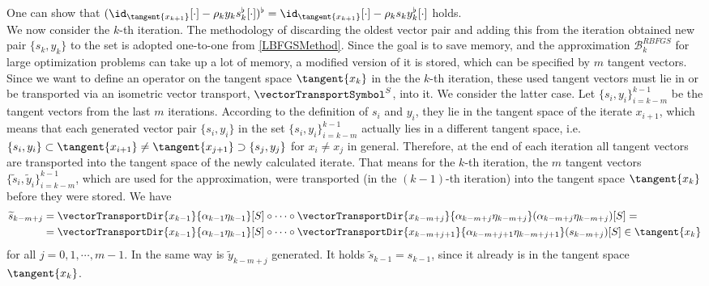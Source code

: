 One can show that $(\id_{\tangent{x_{k+1}}}[\cdot] - \rho_k y_k s^{\flat}_k [\cdot])^{\flat} = \id_{\tangent{x_{k+1}}}[\cdot] - \rho_k s_k y^{\flat}_k [\cdot]$ holds. \\
We now consider the $k$-th iteration. The methodology of discarding the oldest vector pair and adding this from the iteration obtained new pair $\{ s_k, y_k\}$ to the set is adopted one-to-one from \cref{LBFGSMethod}. Since the goal is to save memory, and the approximation $\mathcal{B}^{RBFGS}_k$ for large optimization problems can take up a lot of memory, a modified version of it is stored, which can be specified by $m$ tangent vectors. Since we want to define an operator on the tangent space $\tangent{x_k}$ in the the $k$-th iteration, these used tangent vectors must lie in or be transported via an isometric vector transport, $\vectorTransportSymbol^S$, into it. We consider the latter case. Let $\{ s_i, y_i\}_{i=k-m}^{k-1}$ be the tangent vectors from the last $m$ iterations. According to the definition of $s_i$ and $y_i$, they lie in the tangent space of the iterate $x_{i+1}$, which means that each generated vector pair $\{ s_i, y_i\}$ in the set $\{ s_i, y_i\}_{i=k-m}^{k-1}$ actually lies in a different tangent space, i.e. $\{ s_i, y_i\} \subset \tangent{x_{i+1}} \neq \tangent{x_{j+1}} \supset \{ s_j, y_j\}$ for $x_i \neq x_j$ in general. Therefore, at the end of each iteration all tangent vectors are transported into the tangent space of the newly calculated iterate. That means for the $k$-th iteration, the $m$ tangent vectors $\{ \widetilde{s}_i, \widetilde{y}_i\}_{i=k-m}^{k-1}$, which are used for the approximation, were transported (in the $(k-1)$-th iteration) into the tangent space $\tangent{x_k}$ before they were stored. We have 
\begin{equation*}
    \begin{split}
        \widetilde{s}_{k-m+j} & = \vectorTransportDir{x_{k-1}}{\alpha_{k-1} \eta_{k-1}}[S] \circ \cdots \circ \vectorTransportDir{x_{k-m+j}}{\alpha_{k-m+j} \eta_{k-m+j}}(\alpha_{k-m+j} \eta_{k-m+j})[S] = \\ &= \vectorTransportDir{x_{k-1}}{\alpha_{k-1} \eta_{k-1}}[S] \circ \cdots \circ \vectorTransportDir{x_{k-m+j+1}}{\alpha_{k-m+j+1} \eta_{k-m+j+1}}(s_{k-m+j})[S] \in \tangent{x_k}
    \end{split}
\end{equation*}
for all $j = 0,1, \cdots, m-1$. In the same way is $\widetilde{y}_{k-m+j}$ generated. It holds $\widetilde{s}_{k-1} = s_{k-1}$, since it already is in the tangent space $\tangent{x_k}$. \\

